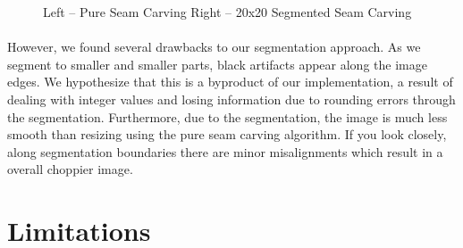 \documentclass[conference]{acmsiggraph}
\begin{document}
\begin{figure}[!ht] 
    \caption{Left -- Pure Seam Carving Right -- 20x20 Segmented Seam Carving}
    \label{fig:leopard_lady_compare}
\end{figure}
\paragraph{}
However, we found several drawbacks to our segmentation approach.  As we segment to smaller and smaller parts, black artifacts appear along the image edges. We hypothesize that this is a byproduct of our implementation, a result of dealing with integer values and losing information due to rounding errors through the segmentation.  Furthermore, due to the segmentation, the image is much less smooth than resizing using the pure seam carving algorithm.  If you look closely, along segmentation boundaries there are minor misalignments which result in a overall choppier image.   


\section{Limitations}
\end{document}
